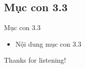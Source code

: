 \documentclass{beamer}
\begin{document}
\subsection{Mục con 3.3}
\begin{frame}{Mục con 3.3}
\begin{itemize}
\item Nội dung mục con 3.3
\end{itemize}
\end{frame}

\begin{frame}{}
\centering
\Huge{Thanks for listening!}
\end{frame}
\end{document}
